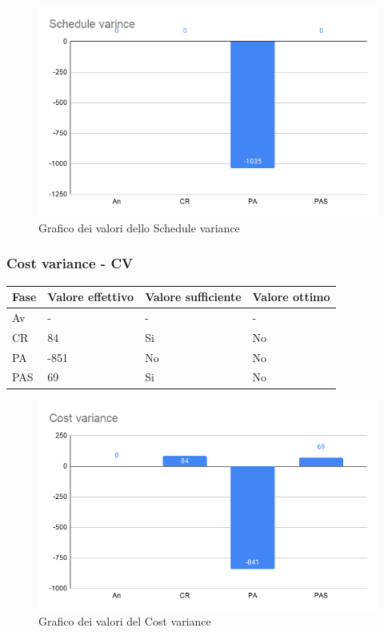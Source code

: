     \begin{figure}[H]
        \centering
        \includegraphics[width=10 cm]{source/sections/images/schedule_variance.png}
        \caption{Grafico dei valori dello Schedule variance}
    \end{figure}


\subsubsection{Cost variance - CV}
\begin{longtabu} to \textwidth {| X[0.1,c m] | X[0.1,c m] | X[0.1,c m] | X[0.1,c m]|}
    \hline
    \textbf{Fase} &
    \textbf{Valore effettivo} & 
    \textbf{Valore sufficiente} & 
    \textbf{Valore ottimo} \\
    \hline
    Av & - & - & - \\ 
    \hline
    CR & 84 & Si & No \\
    \hline
    PA & -851 & No & No \\
    \hline 
    PAS & 69 & Si & No \\
    \hline
    \end{longtabu}

    \begin{figure}[H]
        \centering
        \includegraphics[width=10 cm]{source/sections/images/cost_variance.png}
        \caption{Grafico dei valori del Cost variance}
    \end{figure}

